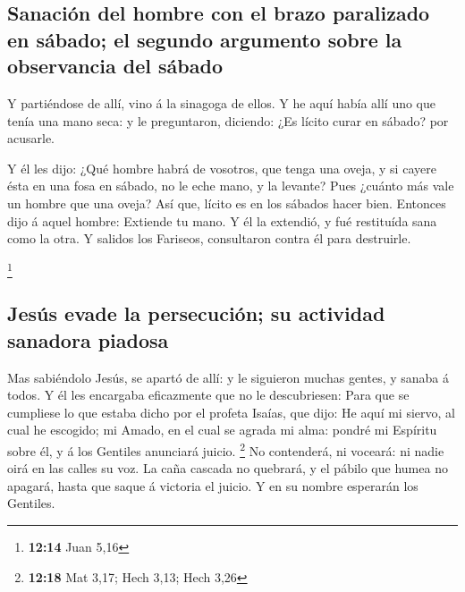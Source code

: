 \hypertarget{sanaciuxf3n-del-hombre-con-el-brazo-paralizado-en-suxe1bado-el-segundo-argumento-sobre-la-observancia-del-suxe1bado}{%
\subsection{Sanación del hombre con el brazo paralizado en sábado; el
segundo argumento sobre la observancia del
sábado}\label{sanaciuxf3n-del-hombre-con-el-brazo-paralizado-en-suxe1bado-el-segundo-argumento-sobre-la-observancia-del-suxe1bado}}

 Y partiéndose de allí, vino á la sinagoga de ellos.
 Y he aquí había allí uno que tenía una mano seca: y le
preguntaron, diciendo: ¿Es lícito curar en sábado? por acusarle.

 Y él les dijo: ¿Qué hombre habrá de vosotros, que tenga
una oveja, y si cayere ésta en una fosa en sábado, no le eche mano, y la
levante?  Pues ¿cuánto más vale un hombre que una oveja?
Así que, lícito es en los sábados hacer bien.  Entonces
dijo á aquel hombre: Extiende tu mano. Y él la extendió, y fué
restituída sana como la otra.  Y salidos los Fariseos,
consultaron contra él para destruirle.

\footnote{\textbf{12:14} Juan 5,16}

\hypertarget{jesuxfas-evade-la-persecuciuxf3n-su-actividad-sanadora-piadosa}{%
\subsection{Jesús evade la persecución; su actividad sanadora
piadosa}\label{jesuxfas-evade-la-persecuciuxf3n-su-actividad-sanadora-piadosa}}

 Mas sabiéndolo Jesús, se apartó de allí: y le siguieron
muchas gentes, y sanaba á todos.  Y él les encargaba
eficazmente que no le descubriesen:  Para que se
cumpliese lo que estaba dicho por el profeta Isaías, que dijo:
 He aquí mi siervo, al cual he escogido; mi Amado, en el
cual se agrada mi alma: pondré mi Espíritu sobre él, y á los Gentiles
anunciará juicio. \footnote{\textbf{12:18} Mat 3,17; Hech 3,13; Hech
  3,26}  No contenderá, ni voceará: ni nadie oirá en las
calles su voz.  La caña cascada no quebrará, y el pábilo
que humea no apagará, hasta que saque á victoria el juicio.
 Y en su nombre esperarán los Gentiles.

